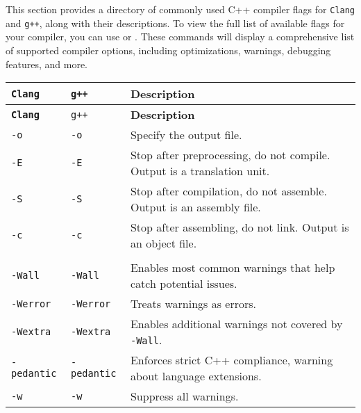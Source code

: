 \documentclass[12pt]{article}
\begin{document}
This section provides a directory of commonly used C++ compiler flags for \texttt{Clang} and \texttt{g++}, along with their descriptions.
To view the full list of available flags for your compiler, you can use  or .
These commands will display a comprehensive list of supported compiler options, including optimizations, warnings, debugging features, and more.

\begin{center}
\label{tab:compiler-flags-begin}
\renewcommand{\arraystretch}{1.25}
\begin{longtable}{>{\raggedright\arraybackslash}p{} >{\raggedright\arraybackslash}p{} >{\raggedright\arraybackslash}p{}}
	\toprule[1.5pt]
	\textbf{\texttt{Clang}} & \texttt{g++} & \textbf{Description} \\
	\midrule
	\endfirsthead

	\toprule[1.5pt]
	\textbf{\texttt{Clang}} & \texttt{g++} & \textbf{Description} \\
	\midrule
	\endhead

	\midrule
	\endfoot

	\endlastfoot

	\texttt{-o} & \texttt{-o} & Specify the output file.\\
	\texttt{-E} & \texttt{-E} & Stop after preprocessing, do not compile. Output is a translation unit. \\
	\texttt{-S} & \texttt{-S} & Stop after compilation, do not assemble. Output is an assembly file. \\
	\texttt{-c} & \texttt{-c} & Stop after assembling, do not link. Output is an object file. \\

	\midrule
	\multicolumn{3}{l}{\textbf{Warning Flags}}\\
	\texttt{-Wall} & \texttt{-Wall} & Enables most common warnings that help catch potential issues. \\
	\texttt{-Werror} & \texttt{-Werror} & Treats warnings as errors. \\
	\texttt{-Wextra} & \texttt{-Wextra} & Enables additional warnings not covered by \texttt{-Wall}. \\
	\texttt{-pedantic} & \texttt{-pedantic} & Enforces strict C++ compliance, warning about language extensions. \\
	\texttt{-w} & \texttt{-w} & Suppress all warnings. \\


\end{longtable}
\end{center}
\end{document}

